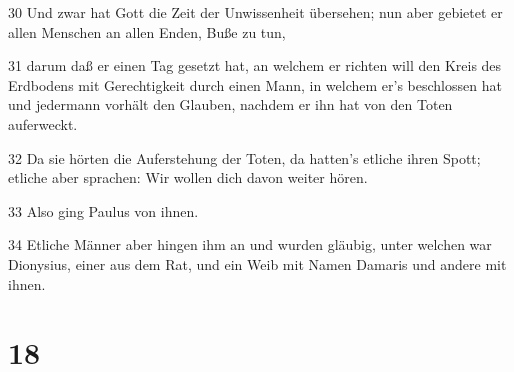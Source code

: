 \par 30 Und zwar hat Gott die Zeit der Unwissenheit übersehen; nun aber gebietet er allen Menschen an allen Enden, Buße zu tun,
\par 31 darum daß er einen Tag gesetzt hat, an welchem er richten will den Kreis des Erdbodens mit Gerechtigkeit durch einen Mann, in welchem er's beschlossen hat und jedermann vorhält den Glauben, nachdem er ihn hat von den Toten auferweckt.
\par 32 Da sie hörten die Auferstehung der Toten, da hatten's etliche ihren Spott; etliche aber sprachen: Wir wollen dich davon weiter hören.
\par 33 Also ging Paulus von ihnen.
\par 34 Etliche Männer aber hingen ihm an und wurden gläubig, unter welchen war Dionysius, einer aus dem Rat, und ein Weib mit Namen Damaris und andere mit ihnen.

\chapter{18}

